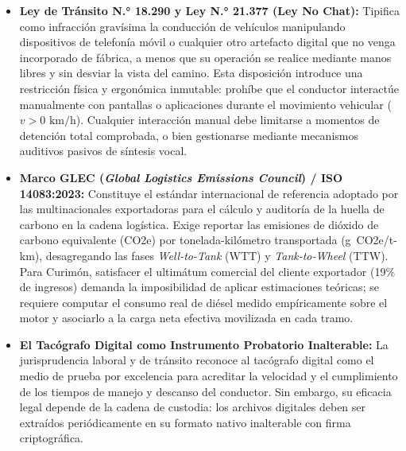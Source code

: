 \begin{itemize}
\begin{itemize}
    \item El \textbf{D.S. N.° 43/2015} del MINSAL regula el almacenamiento de sustancias peligrosas en instalaciones fijas (Terminal Matriz San Bernardo y patios de acopio). Exige distancias de segregación química, pretiles de retención de derrames, sistemas de extinción certificados y prohíbe taxativamente la permanencia o pernoctación de camiones cargados con sustancias incompatibles en áreas no habilitadas.
  \end{itemize}
  \item \textbf{Ley de Tránsito N.° 18.290 y Ley N.° 21.377 (Ley No Chat):} Tipifica como infracción gravísima la conducción de vehículos manipulando dispositivos de telefonía móvil o cualquier otro artefacto digital que no venga incorporado de fábrica, a menos que su operación se realice mediante manos libres y sin desviar la vista del camino. Esta disposición introduce una restricción física y ergonómica inmutable: prohíbe que el conductor interactúe manualmente con pantallas o aplicaciones durante el movimiento vehicular ($v > 0\text{ km/h}$). Cualquier interacción manual debe limitarse a momentos de detención total comprobada, o bien gestionarse mediante mecanismos auditivos pasivos de síntesis vocal.
  \item \textbf{Marco GLEC (\textit{Global Logistics Emissions Council}) / ISO 14083:2023:} Constituye el estándar internacional de referencia adoptado por las multinacionales exportadoras para el cálculo y auditoría de la huella de carbono en la cadena logística. Exige reportar las emisiones de dióxido de carbono equivalente (CO2e) por tonelada-kilómetro transportada (g~CO2e/t-km), desagregando las fases \textit{Well-to-Tank} (WTT) y \textit{Tank-to-Wheel} (TTW). Para Curimón, satisfacer el ultimátum comercial del cliente exportador (19\% de ingresos) demanda la imposibilidad de aplicar estimaciones teóricas; se requiere computar el consumo real de diésel medido empíricamente sobre el motor y asociarlo a la carga neta efectiva movilizada en cada tramo.
  \item \textbf{El Tacógrafo Digital como Instrumento Probatorio Inalterable:} La jurisprudencia laboral y de tránsito reconoce al tacógrafo digital como el medio de prueba por excelencia para acreditar la velocidad y el cumplimiento de los tiempos de manejo y descanso del conductor. Sin embargo, su eficacia legal depende de la cadena de custodia: los archivos digitales deben ser extraídos periódicamente en su formato nativo inalterable con firma criptográfica.
\end{itemize}

